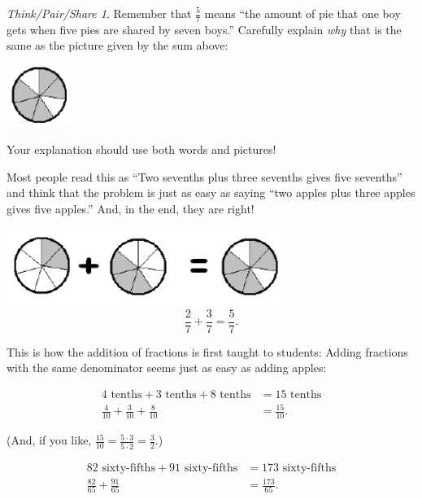 \documentclass[10pt, reqno]{amsart}
\theoremstyle{remark}
\newtheorem*{thinkpair*}{Think/Pair/Share}
\theoremstyle{definition}
\numberwithin{equation}{section}  %
\begin{document}
\begin{thinkpair*}
Remember that $\frac 5 7$ means ``the amount of pie that one boy gets when five pies are shared by seven boys.''  Carefully explain \emph{why} that is the same as the picture given by the sum above:
    \begin{center}
\includegraphics[height = 2cm]{sumseventhspie}
\end{center}
Your explanation should use both words and pictures!


\end{thinkpair*}




Most people read this as ``Two sevenths plus three sevenths gives five sevenths''
and think that the problem is just as easy as saying ``two apples plus three apples
gives five apples.'' And, in the end, they are right!
   \begin{center}
\includegraphics[height = 2.5cm]{addseventhspie}
\[
\frac 2 7 + \frac 3 7 = \frac 5 7.
\]
\end{center}

This is how the addition of fractions is first taught to students: Adding fractions
with the same denominator seems just as easy as adding apples:


\begin{align*}
4 \text{ tenths} + 3 \text{ tenths} + 8 \text{ tenths} & = 15 \text{ tenths}\\
\frac 4 {10} + \frac 3 {10} + \frac 8 {10} &= \frac{15}{10}.
\end{align*}

(And, if you like,
$\frac{15}{10} = \frac{5\cdot 3}{5\cdot 2} = \frac 3 2$.)


\begin{align*}
82 \text{ sixty-fifths} + 91 \text{ sixty-fifths} & = 173 \text{ sixty-fifths}\\
\frac {82} {65} + \frac {91} {65}  &= \frac{173}{65}.
\end{align*}
\end{document}
